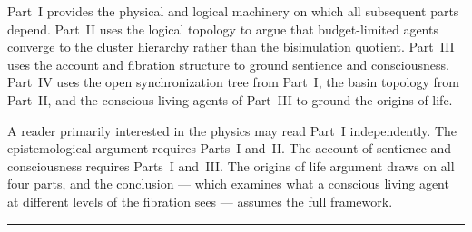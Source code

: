 \documentclass[12pt]{article}
\theoremstyle{remark}
\begin{document}
\begin{center}
\end{center}

Part~I provides the physical and logical machinery on which all
subsequent parts depend.
Part~II uses the logical topology to argue that budget-limited
agents converge to the cluster hierarchy rather than the
bisimulation quotient.
Part~III uses the account and fibration structure to ground
sentience and consciousness.
Part~IV uses the open synchronization tree from Part~I, the basin
topology from Part~II, and the conscious living agents of Part~III
to ground the origins of life.

A reader primarily interested in the physics may read Part~I
independently.
The epistemological argument requires Parts~I and~II.
The account of sentience and consciousness requires Parts~I
and~III.
The origins of life argument draws on all four parts, and the
conclusion --- which examines what a conscious living agent at
different levels of the fibration sees --- assumes the full
framework.

\bigskip
\noindent\hrule
\bigskip
\end{document}
